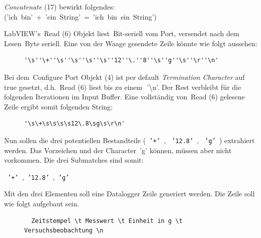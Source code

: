 {\begin{center}
\textit{Concatenate} (17) bewirkt folgendes: \mbox{(\mbox{'ich bin'} + \mbox{'ein String'} = \mbox{'ich bin ein String'})}
\end{center}  

\noindent LabVIEW's \,{\Menlo Read} (6) Objekt liest \,{\Menlo Bit}-seriell vom Port, versendet nach dem Lesen \,{\Menlo Byte} seriell. Eine von der Waage gesendete Zeile könnte wie folgt aussehen:

\begin{figure}[h!] %
\centering
\begin{BVerbatim}
'\s''\+''\s''\s''\s''\s''12''\.''8''\s''g''\s''\r''\n'
\end{BVerbatim}
\end{figure}


\noindent Bei dem \,{\Menlo Configure Port} Objekt (4) ist per default\textit{ Termination Character} auf\, \,{\Menlo true} gesetzt, d.h. \,{\Menlo Read} (6) liest bis zu einem\, \,{\Menlo '\textbackslash n'}. Der Rest verbleibt für die folgenden Iterationen im Input Buffer. Eine vollständig von \,{\Menlo Read} (6) gelesene Zeile ergibt somit folgenden String:


\begin{figure}[h!] %
\centering
\begin{varwidth}{\linewidth}
\begin{verbatim}
'\s\+\s\s\s\s12\.8\sg\s\r\n'
\end{verbatim}
\end{varwidth}
\end{figure}


\noindent Nun sollen die drei potentiellen Bestandteile (\texttt{ '+' }, \texttt{ '12.8' }, \texttt{ 'g' }) extrahiert werden. Das Vorzeichen und der Character \,{\Menlo 'g'} können, müssen aber nicht vorkommen. Die drei Submatches sind somit: 
\vspace{-2pt}
\begin{center}  \texttt{ '+' },\texttt{ '12.8' },\texttt{ 'g' } \end{center}

\noindent Mit den drei Elementen soll eine Datalogger Zeile generiert werden. Die Zeile soll wie folgt aufgebaut sein.

\begin{figure}[h!] %
\begin{center}
\begin{varwidth}{\linewidth}
\begin{verbatim}
  Zeitstempel \t Messwert \t Einheit in g \t Versuchsbeobachtung \n
\end{verbatim}
\end{varwidth}
\end{center}
\end{figure}

}
